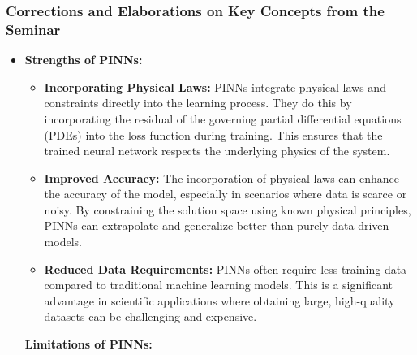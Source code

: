 \documentclass[
]{article}
\author{}
\date{}
\begin{document}
\subsubsection{Corrections and Elaborations on Key Concepts from the
Seminar}\label{corrections-and-elaborations-on-key-concepts-from-the-seminar}

\begin{itemize}
\item
  \textbf{Strengths of PINNs:}

  \begin{itemize}
  
  \item
    \textbf{Incorporating Physical Laws:} PINNs integrate physical laws
    and constraints directly into the learning process. They do this by
    incorporating the residual of the governing partial differential
    equations (PDEs) into the loss function during training. This
    ensures that the trained neural network respects the underlying
    physics of the system.
  \item
    \textbf{Improved Accuracy:} The incorporation of physical laws can
    enhance the accuracy of the model, especially in scenarios where
    data is scarce or noisy. By constraining the solution space using
    known physical principles, PINNs can extrapolate and generalize
    better than purely data-driven models.
  \item
    \textbf{Reduced Data Requirements:} PINNs often require less
    training data compared to traditional machine learning models. This
    is a significant advantage in scientific applications where
    obtaining large, high-quality datasets can be challenging and
    expensive.
  \end{itemize}

  \textbf{Limitations of PINNs:}

  \begin{itemize}
  

\end{itemize}
\end{itemize}
\end{document}
